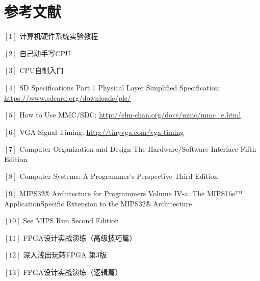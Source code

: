 \documentclass[11pt,utf8]{report}
\begin{document}
\chapter{参考文献}

$[1] $ 计算机硬件系统实验教程

$[2] $ 自己动手写CPU

$[3] $ CPU自制入门

$[4] $ SD Specifications Part 1 Physical Layer Simplified Specification: \url{https://www.sdcard.org/downloads/pls/}

$[5] $ How to Use MMC/SDC: \url{http://elm-chan.org/docs/mmc/mmc\_e.html}

$[6] $ VGA Signal Timing: \url{http://tinyvga.com/vga-timing}

$[7] $ Computer Organization and Design The Hardware/Software Interface Fifth Edition

$[8] $ Computer Systems: A Programmer's Perspective Third Edition

$[9] $ MIPS32® Architecture for Programmers Volume IV-a: The MIPS16e™ ApplicationSpecific Extension to the MIPS32® Architecture

$[10]$ See MIPS Run Second Edition

$[11]$  FPGA设计实战演练（高级技巧篇）

$[12]$  深入浅出玩转FPGA 第3版

$[13]$  FPGA设计实战演练（逻辑篇）
\end{document}
